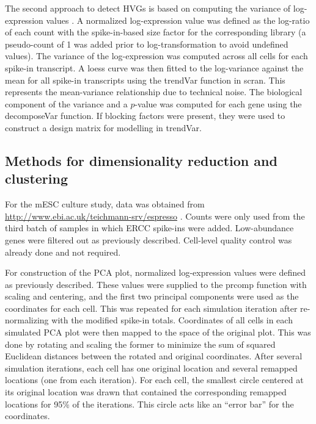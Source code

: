 \documentclass{article}
\begin{document}
The second approach to detect HVGs is based on computing the variance of log-expression values \cite{lun2016step}.
A normalized log-expression value was defined as the log-ratio of each count with the spike-in-based size factor for the corresponding library
    (a pseudo-count of 1 was added prior to log-transformation to avoid undefined values).
The variance of the log-expression was computed across all cells for each spike-in transcript.
A loess curve was then fitted to the log-variance against the mean for all spike-in transcripts using the trendVar function in scran.
This represents the mean-variance relationship due to technical noise.
The biological component of the variance and a $p$-value was computed for each gene using the decomposeVar function.
If blocking factors were present, they were used to construct a design matrix for modelling in trendVar.

\subsection{Methods for dimensionality reduction and clustering}
For the mESC culture study, data was obtained from \url{http://www.ebi.ac.uk/teichmann-srv/espresso} \cite{kolod2015single}.
Counts were only used from the third batch of samples in which ERCC spike-ins were added.
Low-abundance genes were filtered out as previously described.
Cell-level quality control was already done and not required.

For construction of the PCA plot, normalized log-expression values were defined as previously described.
These values were supplied to the prcomp function with scaling and centering, and the first two principal components were used as the coordinates for each cell.
This was repeated for each simulation iteration after re-normalizing with the modified spike-in totals.
Coordinates of all cells in each simulated PCA plot were then mapped to the space of the original plot.
This was done by rotating and scaling the former to minimize the sum of squared Euclidean distances between the rotated and original coordinates.
After several simulation iterations, each cell has one original location and several remapped locations (one from each iteration). 
For each cell, the smallest circle centered at its original location was drawn that contained the corresponding remapped locations for 95\% of the iterations.
This circle acts like an ``error bar'' for the coordinates.
\end{document}

